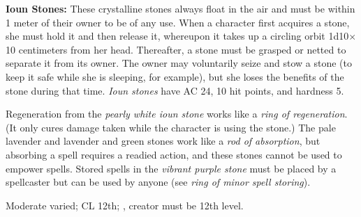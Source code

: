 \textbf{Ioun Stones:} These crystalline stones always float in the air and must be within 1 meter of their owner to be of any use. When a character first acquires a stone, she must hold it and then release it, whereupon it takes up a circling orbit 1d10$\times$ 10 centimeters from her head. Thereafter, a stone must be grasped or netted to separate it from its owner. The owner may voluntarily seize and stow a stone (to keep it safe while she is sleeping, for example), but she loses the benefits of the stone during that time. \emph{Ioun stones} have AC 24, 10 hit points, and hardness 5.

Regeneration from the \emph{pearly white ioun stone} works like a \emph{ring of regeneration}. (It only cures damage taken while the character is using the stone.) The pale lavender and lavender and green stones work like a \emph{rod of absorption}, but absorbing a spell requires a readied action, and these stones cannot be used to empower spells. Stored spells in the \emph{vibrant purple stone} must be placed by a spellcaster but can be used by anyone (see \emph{ring of minor spell storing}).

Moderate varied; CL 12th; , creator must be 12th level.









